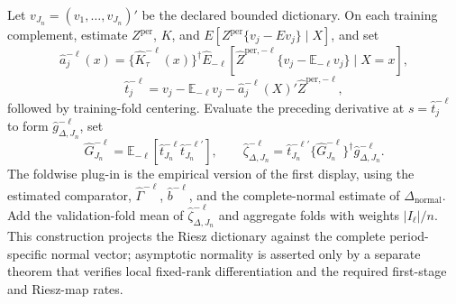 Let \(v_{J_n}=(v_1,\ldots,v_{J_n})'\) be the declared bounded dictionary.  On each training complement, estimate \(Z^{\mathrm{per}}\), \(K\), and \(E[Z^{\mathrm{per}}\{v_j-Ev_j\}\mid X]\), and set
\[
\widehat a_j^{-\ell}(x)=\{\widehat K_\tau^{-\ell}(x)\}^{\dagger}
\widehat E_{-\ell}[\widehat Z^{\mathrm{per},-\ell}\{v_j-\mathbb E_{-\ell}v_j\}\mid X=x],
\]
\[
\widehat t_j^{-\ell}=v_j-\mathbb E_{-\ell}v_j
-\widehat a_j^{-\ell}(X)'\widehat Z^{\mathrm{per},-\ell},
\]
followed by training-fold centering.  Evaluate the preceding derivative at \(s=\widehat t_j^{-\ell}\) to form \(\widehat g_{\Delta,J_n}^{-\ell}\), set
\[
\widehat G_{J_n}^{-\ell}=\mathbb E_{-\ell}[\widehat t_{J_n}^{-\ell}
\widehat t_{J_n}^{-\ell\prime}],
\qquad
\widehat\zeta_{\Delta,J_n}^{-\ell}
=\widehat t_{J_n}^{-\ell\prime}
\{\widehat G_{J_n}^{-\ell}\}^{\dagger}\widehat g_{\Delta,J_n}^{-\ell}.
\]
The foldwise plug-in is the empirical version of the first display, using the estimated comparator, \(\widehat\Gamma^{-\ell}\), \(\widehat b^{-\ell}\), and the complete-normal estimate of \(\Delta_{\mathrm{normal}}\).  Add the validation-fold mean of \(\widehat\zeta_{\Delta,J_n}^{-\ell}\) and aggregate folds with weights \(|I_\ell|/n\).  This construction projects the Riesz dictionary against the complete period-specific normal vector; asymptotic normality is asserted only by a separate theorem that verifies local fixed-rank differentiation and the required first-stage and Riesz-map rates.
